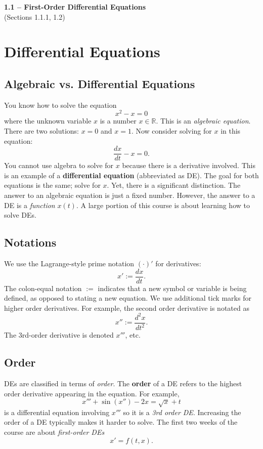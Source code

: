 \documentclass[11pt,letterpaper]{article}
\begin{document}
\setlength{\parskip}{6pt}
\begin{center}
\Large\textbf{1.1 – First-Order Differential Equations}\\
\normalsize (Sections 1.1.1, 1.2)
\end{center}

\section{Differential Equations}

\subsection{Algebraic vs. Differential Equations}
You know how to solve the equation
    \[x^2-x=0\] 
where the unknown variable $x$ is a number $x\in\mathbb{R}$. This is an \textit{algebraic equation}. There are two solutions: $x=0$ and $x=1$. Now consider solving for $x$ in this equation:
  \[ \frac{dx}{dt} - x = 0.\]
You cannot use algebra to solve for $x$ because there is a derivative involved. This is an example of a \textbf{differential equation} (abbreviated as DE). The goal for both equations is the same; solve for $x$. Yet, there is a significant distinction. The answer to an algebraic equation is just a fixed number. However, the answer to a DE is a \textit{function} $x(t)$. A large portion of this course is about learning how to solve DEs.

\subsection{Notations}
We use the Lagrange-style prime notation $(\cdot)'$ for derivatives:
\[
    x' := \frac{dx}{dt}. 
\]
The colon-equal notation $:=$ indicates that a new symbol or variable is being defined, as opposed to stating a new equation. We use additional tick marks for higher order derivatives. For example, the second order derivative is notated as
\[
    x'' := \frac{d^2x}{dt^2}.
\]
The 3rd-order derivative is denoted $x'''$, etc. 

\subsection{Order}
DEs are classified in terms of \textit{order}. The \textbf{order} of a DE refers to the highest order derivative appearing in the equation.
For example, 
\[
    x'''+\sin(x'') - 2x = \sqrt{x} +t 
\]
is a differential equation involving $x'''$ so it is a \textit{3rd order DE}. Increasing the order of a DE typically makes it harder to solve. The first two weeks of the course are about \textit{first-order DEs} 
\[
x' = f(t,x).
\]
\end{document}
